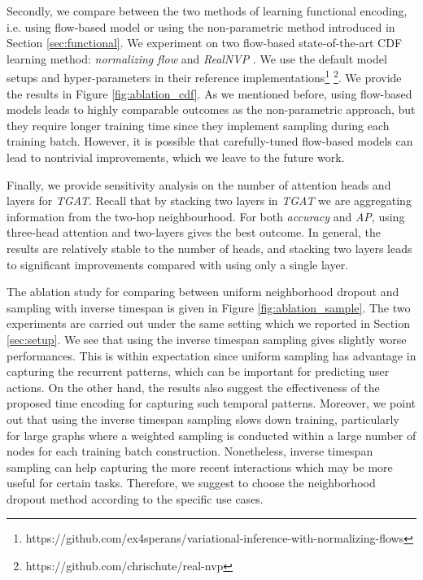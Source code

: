 \documentclass{article} %
\begin{document}
Secondly, we compare between the two methods of learning functional encoding, i.e. using flow-based model or using the non-parametric method introduced in Section \ref{sec:functional}. We experiment on two flow-based state-of-the-art CDF learning method: \emph{normalizing flow} \citep{rezende2015variational} and \emph{RealNVP} \citep{dinh2016density}. We use the default model setups and hyper-parameters in their reference implementations\footnote{https://github.com/ex4sperans/variational-inference-with-normalizing-flows} \footnote{https://github.com/chrischute/real-nvp}. We provide the results in Figure \ref{fig:ablation_cdf}. As we mentioned before, using flow-based models leads to highly comparable outcomes as the non-parametric approach, but they require longer training time since they implement sampling during each training batch. However, it is possible that carefully-tuned flow-based models can lead to nontrivial improvements, which we leave to the future work.

Finally, we provide sensitivity analysis on the number of attention heads and layers for \textsl{TGAT}. Recall that by stacking two layers in \textsl{TGAT} we are aggregating information from the two-hop neighbourhood. For both \emph{accuracy} and \emph{AP}, using three-head attention and two-layers gives the best outcome. In general, the results are relatively stable to the number of heads, and stacking two layers leads to significant improvements compared with using only a single layer.

The ablation study for comparing between uniform neighborhood dropout and sampling with inverse timespan is given in Figure \ref{fig:ablation_sample}. The two experiments are carried out under the same setting which we reported in Section \ref{sec:setup}. We see that using the inverse timespan sampling gives slightly worse performances. This is within expectation since uniform sampling has advantage in capturing the recurrent patterns, which can be important for predicting user actions. On the other hand, the results also suggest the effectiveness of the proposed time encoding for capturing such temporal patterns. Moreover, we point out that using the inverse timespan sampling slows down training, particularly for large graphs where a weighted sampling is conducted within a large number of nodes for each training batch construction. Nonetheless, inverse timespan sampling can help capturing the more recent interactions which may be more useful for certain tasks. Therefore, we suggest to choose the neighborhood dropout method according to the specific use cases.
\end{document}
